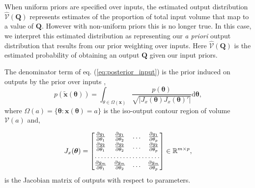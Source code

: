 \documentclass[10pt,letterpaper]{article}
\begin{document}
\vspace{0.5cm}

When uniform priors are specified over inputs, the estimated output distribution $\widehat{\mathcal{V}}(\boldsymbol{Q})$ represents estimates of the proportion of total input volume that map to a value of $\boldsymbol{Q}$. However with non-uniform priors this is no longer true. In this case, we interpret this estimated distribution as representing our \textit{a priori} output distribution that results from our prior weighting over inputs. Here $\widehat{\mathcal{V}}(\boldsymbol{Q})$ is the estimated probability of obtaining an output $\boldsymbol{Q}$ given our input priors.

The denominator term of eq. (\ref{eq:posterior_input}) is the prior induced on outputs by the prior over inputs \cite{yang2018infinite},
%
\begin{equation}
p(\tilde{\boldsymbol{x}}(\boldsymbol{\theta})) = \int_{\theta\in \Omega(\boldsymbol{x})} \frac{p(\boldsymbol{\theta})}{\sqrt{|J_x(\boldsymbol{\theta}) J_x(\boldsymbol{\theta})'|}} \mathrm{d}\boldsymbol{\theta},
\end{equation}
%
where $\Omega(a) = \{\boldsymbol{\theta}: \boldsymbol{x}(\boldsymbol{\theta}) = a\}$ is the iso-output contour region of volume $\mathcal{V}(a)$ and,

\begin{equation}
J_x(\boldsymbol{\theta}) = 
\begin{bmatrix}
\frac{\partial g_1}{\partial \theta_1}       & \frac{\partial g_1}{\partial \theta_2} & \dots & \frac{\partial g_1}{\partial \theta_p}\\
\frac{\partial g_2}{\partial \theta_1}       & \frac{\partial g_2}{\partial \theta_2} & \dots & \frac{\partial g_2}{\partial \theta_p}\\
\hdotsfor{4} \\
\frac{\partial g_m}{\partial \theta_1}       & \frac{\partial g_m}{\partial \theta_2} & \dots & \frac{\partial g_m}{\partial \theta_p}
\end{bmatrix}
\in \mathbb{R}^{m\times p},
\end{equation}
%
is the Jacobian matrix of outputs with respect to parameters.

\end{document}
